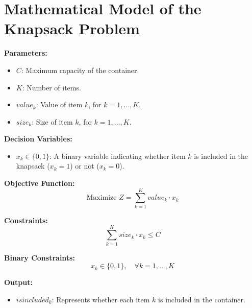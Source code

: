 \documentclass{article}
\begin{document}
\section*{Mathematical Model of the Knapsack Problem}

\textbf{Parameters:}
\begin{itemize}
    \item $C$: Maximum capacity of the container.
    \item $K$: Number of items.
    \item $value_k$: Value of item $k$, for $k = 1, \ldots, K$.
    \item $size_k$: Size of item $k$, for $k = 1, \ldots, K$.
\end{itemize}

\textbf{Decision Variables:}
\begin{itemize}
    \item $x_k \in \{0, 1\}$: A binary variable indicating whether item $k$ is included in the knapsack ($x_k = 1$) or not ($x_k = 0$).
\end{itemize}

\textbf{Objective Function:}
\[
\text{Maximize } Z = \sum_{k=1}^{K} value_k \cdot x_k
\]

\textbf{Constraints:}
\[
\sum_{k=1}^{K} size_k \cdot x_k \leq C
\]

\textbf{Binary Constraints:}
\[
x_k \in \{0, 1\}, \quad \forall k = 1, \ldots, K
\]

\textbf{Output:}
\begin{itemize}
    \item $isincluded_k$: Represents whether each item $k$ is included in the container.
\end{itemize}
\end{document}
